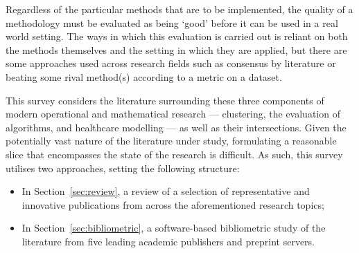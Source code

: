 Regardless of the particular methods that are to be implemented, the quality of
a methodology must be evaluated as being `good'  %
before it can be used in a real
world setting. The ways in which this evaluation is carried out is reliant on
both the methods themselves and the setting in which they are applied, but there
are some approaches used across research fields such as consensus by literature
or beating some rival method(s) according to a metric on a dataset.

This survey considers the literature surrounding these three components of
modern operational and mathematical research --- clustering, the evaluation of
algorithms, and healthcare modelling --- as well as their intersections. Given
the potentially vast nature of the literature under study, formulating a
reasonable slice that encompasses the state of the research is difficult. As
such, this survey utilises two approaches, setting the following structure:

\begin{itemize}
    \item In Section~\ref{sec:review}, a review of a selection of representative
        and innovative publications from across the aforementioned research
        topics;
    \item In Section~\ref{sec:bibliometric}, a software-based bibliometric study
        of the literature from five leading academic publishers and preprint
        servers.
\end{itemize}
